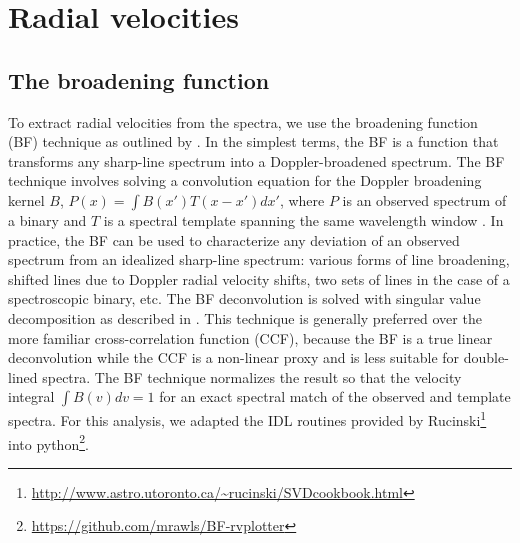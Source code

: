 \section{Radial velocities}\label{rvs}
\subsection{The broadening function}\label{bf}
To extract radial velocities from the spectra, we use the broadening function (BF) technique as outlined by \citet{ruc02}. In the simplest terms, the BF is a function that transforms any sharp-line spectrum into a Doppler-broadened spectrum. The BF technique involves solving a convolution equation for the Doppler broadening kernel $B$, $P(x) = \int B(x') T(x - x') dx'$, where $P$ is an observed spectrum of a binary and $T$ is a spectral template spanning the same wavelength window \citep{ruc14}. In practice, the BF can be used to characterize any deviation of an observed spectrum from an idealized sharp-line spectrum: various forms of line broadening, shifted lines due to Doppler radial velocity shifts, two sets of lines in the case of a spectroscopic binary, etc. The BF deconvolution is solved with singular value decomposition as described in \citet{ruc02}. This technique is generally preferred over the more familiar cross-correlation function (CCF), because the BF is a true linear deconvolution while the CCF is a non-linear proxy and is less suitable for double-lined spectra. The BF technique normalizes the result so that the velocity integral $\int B(v) dv = 1$ for an exact spectral match of the observed and template spectra. For this analysis, we adapted the IDL routines provided by Rucinski\footnote{\url{http://www.astro.utoronto.ca/~rucinski/SVDcookbook.html}} into python\footnote{\url{https://github.com/mrawls/BF-rvplotter}}.

